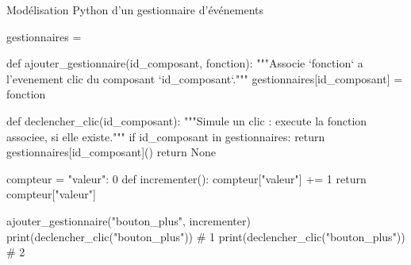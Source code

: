 \begin{codereference}{Modélisation Python d'un gestionnaire d'événements}
\begin{python}
gestionnaires = {}

def ajouter_gestionnaire(id_composant, fonction):
    """Associe `fonction` a l'evenement clic du composant `id_composant`."""
    gestionnaires[id_composant] = fonction

def declencher_clic(id_composant):
    """Simule un clic : execute la fonction associee, si elle existe."""
    if id_composant in gestionnaires:
        return gestionnaires[id_composant]()
    return None

compteur = {"valeur": 0}
def incrementer():
    compteur["valeur"] += 1
    return compteur["valeur"]

ajouter_gestionnaire("bouton_plus", incrementer)
print(declencher_clic("bouton_plus"))  # 1
print(declencher_clic("bouton_plus"))  # 2
\end{python}
\end{codereference}



